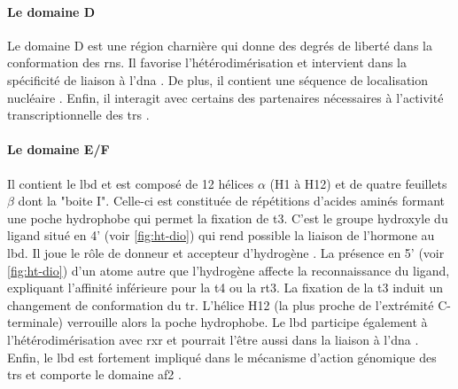 \documentclass[../main.tex]{subfiles}
\begin{document}
\paragraph{Le domaine D}
Le domaine D est une région charnière qui donne des degrés de liberté dans la conformation des \glspl{rn}.
Il favorise l'hétérodimérisation et intervient dans la spécificité de liaison à l'\gls{dna} \citep{Miyamoto2001}.
De plus, il contient une séquence de localisation nucléaire \citep{Hamy1992a}.
Enfin, il interagit avec certains des partenaires nécessaires à l'activité transcriptionnelle des \glspl{tr} \citep{Lin1991,Horlein1995}.

\paragraph{Le domaine E/F}
Il contient le \gls{lbd} et est composé de 12 hélices $\alpha$ (H1 à H12) et de quatre feuillets $\beta$ dont la "boite I".
Celle-ci est constituée de répétitions d'acides aminés formant une poche hydrophobe qui permet la fixation de \gls{t3}.
C'est le groupe hydroxyle du ligand situé en 4' (voir \autoref{fig:ht-dio}) qui rend possible la liaison de l'hormone au \gls{lbd}.
Il joue le rôle de donneur et accepteur d’hydrogène \citep{Dietrich1977}.
La présence en 5' (voir \autoref{fig:ht-dio}) d'un atome autre que l'hydrogène affecte la reconnaissance du ligand, expliquant l'affinité inférieure pour la \gls{t4} ou la \gls{rt3}.
La fixation de la \gls{t3} induit un changement de conformation du \gls{tr}.
L'hélice H12 (la plus proche de l'extrémité C-terminale) verrouille alors la poche hydrophobe.
Le \gls{lbd} participe également à l'hétérodimérisation avec \gls{rxr} \citep{Wagner1995,Bain2007} et pourrait l'être aussi dans la liaison à l'\gls{dna} \citep{Figueira2010}.
Enfin, le \gls{lbd} est fortement impliqué dans le mécanisme d'action génomique des \glspl{tr} et comporte le domaine \gls{af2} \citep{Barettino1994,Tone1994}.

\end{document}
